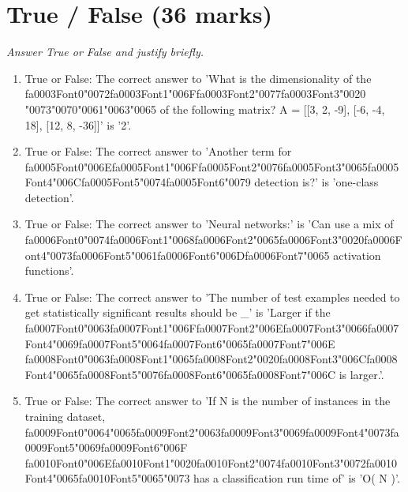 \documentclass[12pt]{article}
\begin{document}
\section*{True / False (36 marks)}
\textit{Answer True or False and justify briefly.}
\begin{enumerate}[label=\arabic*.]
\item True or False: The correct answer to 'What is the dimensionality of the {\csname fa0003Font0\endcsname\char"0072}{\csname fa0003Font1\endcsname\char"006F}{\csname fa0003Font2\endcsname\char"0077}{\csname fa0003Font3\endcsname\char"0020} {\char"0073}{\char"0070}{\char"0061}{\char"0063}{\char"0065} of the following matrix? A = [[3, 2, -9], [-6, -4, 18], [12, 8, -36]]' is '2'.
\item True or False: The correct answer to 'Another term for {\csname fa0005Font0\endcsname\char"006E}{\csname fa0005Font1\endcsname\char"006F}{\csname fa0005Font2\endcsname\char"0076}{\csname fa0005Font3\endcsname\char"0065}{\csname fa0005Font4\endcsname\char"006C}{\csname fa0005Font5\endcsname\char"0074}{\csname fa0005Font6\endcsname\char"0079} detection is?' is 'one-class detection'.
\item True or False: The correct answer to 'Neural networks:' is 'Can use a mix of {\csname fa0006Font0\endcsname\char"0074}{\csname fa0006Font1\endcsname\char"0068}{\csname fa0006Font2\endcsname\char"0065}{\csname fa0006Font3\endcsname\char"0020}{\csname fa0006Font4\endcsname\char"0073}{\csname fa0006Font5\endcsname\char"0061}{\csname fa0006Font6\endcsname\char"006D}{\csname fa0006Font7\endcsname\char"0065} activation functions'.
\item True or False: The correct answer to 'The number of test examples needed to get statistically significant results should be \_' is 'Larger if the {\csname fa0007Font0\endcsname\char"0063}{\csname fa0007Font1\endcsname\char"006F}{\csname fa0007Font2\endcsname\char"006E}{\csname fa0007Font3\endcsname\char"0066}{\csname fa0007Font4\endcsname\char"0069}{\csname fa0007Font5\endcsname\char"0064}{\csname fa0007Font6\endcsname\char"0065}{\csname fa0007Font7\endcsname\char"006E} {\csname fa0008Font0\endcsname\char"0063}{\csname fa0008Font1\endcsname\char"0065}{\csname fa0008Font2\endcsname\char"0020}{\csname fa0008Font3\endcsname\char"006C}{\csname fa0008Font4\endcsname\char"0065}{\csname fa0008Font5\endcsname\char"0076}{\csname fa0008Font6\endcsname\char"0065}{\csname fa0008Font7\endcsname\char"006C} is larger.'.
\item True or False: The correct answer to 'If N is the number of instances in the training dataset, {\csname fa0009Font0\endcsname\char"0064}{\char"0065}{\csname fa0009Font2\endcsname\char"0063}{\csname fa0009Font3\endcsname\char"0069}{\csname fa0009Font4\endcsname\char"0073}{\csname fa0009Font5\endcsname\char"0069}{\csname fa0009Font6\endcsname\char"006F} {\csname fa0010Font0\endcsname\char"006E}{\csname fa0010Font1\endcsname\char"0020}{\csname fa0010Font2\endcsname\char"0074}{\csname fa0010Font3\endcsname\char"0072}{\csname fa0010Font4\endcsname\char"0065}{\csname fa0010Font5\endcsname\char"0065}{\char"0073} has a classification run time of' is 'O( N )'.

\end{enumerate}
\end{document}
